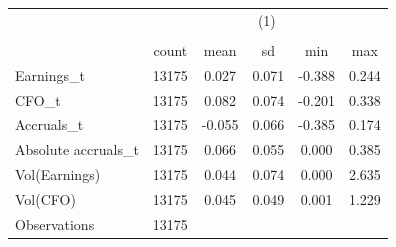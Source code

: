 {
\def\sym#1{\ifmmode^{#1}\else\(^{#1}\)\fi}
\begin{tabular}{l*{1}{ccccc}}
\hline\hline
                    &\multicolumn{5}{c}{(1)}                                         \\
                    &\multicolumn{5}{c}{}                                            \\
                    &       count&        mean&          sd&         min&         max\\
\hline
Earnings\_t          &       13175&       0.027&       0.071&      -0.388&       0.244\\
CFO\_t               &       13175&       0.082&       0.074&      -0.201&       0.338\\
Accruals\_t          &       13175&      -0.055&       0.066&      -0.385&       0.174\\
Absolute accruals\_t &       13175&       0.066&       0.055&       0.000&       0.385\\
Vol(Earnings)       &       13175&       0.044&       0.074&       0.000&       2.635\\
Vol(CFO)            &       13175&       0.045&       0.049&       0.001&       1.229\\
\hline
Observations        &       13175&            &            &            &            \\
\hline\hline
\end{tabular}
}
